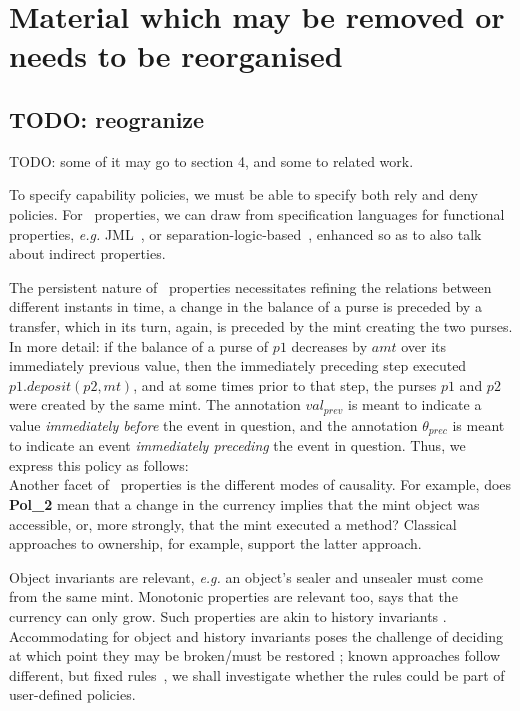   \section{Material which may be removed or needs to be reorganised}

\subsection{TODO: reogranize}

TODO: some of it may go to section 4, and some to related work.

To specify capability policies, we must be able to specify both rely
and deny policies.  For \rely~properties, we can draw from
specification languages for functional properties, {\it e.g.}
JML~\cite{Leavens-etal07}, or
separation-logic-based~\cite{IDF,MattAlex}, enhanced so as to also
talk about indirect properties.



The persistent nature of \deny~properties necessitates  refining the
relations between different instants in time,
\eg a change in the balance of a purse
is preceded by a transfer, which in its turn, again, is preceded by
the mint creating  the two purses. In more detail:
if the balance of a purse of $p1$ decreases by $amt$ over its immediately previous value, then the immediately preceding step executed $p1.deposit(p2,mt)$,  and at some times prior to that step,  the purses $p1$ and $p2$ were created by  the same mint. The annotation $val_{prev}$ is meant to indicate a value  {\em immediately before} the event in question, and the annotation $\theta_{prec}$ is meant to indicate an event  {\em immediately preceding} the event in question. Thus, we express this policy as follows:\\


Another facet of \deny~properties is the different modes of
causality. For example, does {\bf Pol\_2} mean that a change in the currency implies that
the mint object was accessible, or, more strongly, that the mint executed a method?
Classical approaches to ownership, for example, support the latter
approach\cite{ownVerif}.
%
%

Object invariants \cite{Mey88,Parkinson07,pubsdoc:invariants-iwaco09}  are relevant, %
 {\it e.g.} an object's sealer and unsealer must come from the same mint.
Monotonic properties are relevant too,  says that the currency can only grow. Such properties
are akin to history invariants \cite{usinghistory}.
Accommodating for object and history invariants  poses the challenge of deciding
 at which point they may be broken/must be restored \cite{BarnettNaumann04,objInvars};
known approaches  follow different, but fixed rules~\cite{DrossoFrancaMuellerSummers08}, we shall investigate whether the rules could
be part of user-defined policies.
%



